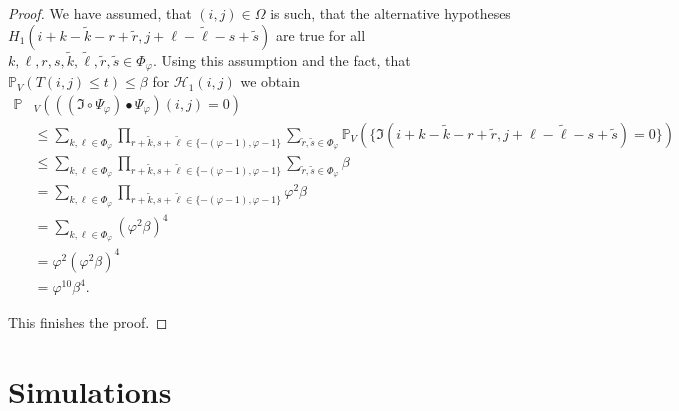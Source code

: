 \documentclass[a4paper,12pt]{article}
\theoremstyle{plain}
\theoremstyle{definition}
\begin{document}
\begin{appendix}
\begin{proof}
		We have assumed, that $(i, j) \in \Omega$ is such, that the alternative hypotheses $H_1(i + k - \tilde{k} - r + \tilde{r}, j + \ell - \tilde{\ell} - s + \tilde{s})$ are true for all $k, \ell, r, s, \tilde{k}, \tilde{\ell}, \tilde{r}, \tilde{s} \in \Phi_\varphi$. Using this assumption and the fact, that $\mathbb{P}_V\left( T(i, j) \leq t \right) \leq \beta$ for $\mathcal{H}_1(i, j)$ we obtain
		\begin{align*}
			\mathbb{P}&_V\left( ((\mathfrak{I} \circ \Psi_\varphi) \bullet \Psi_\varphi)(i, j) = 0 \right) \\
			&\leq \sum_{k, \ell \in \Phi_\varphi} \prod_{r + \tilde{k}, s + \tilde{\ell} \in \{ - ( \varphi - 1 ), \varphi - 1 \}} \sum_{\tilde{r}, \tilde{s} \in \Phi_\varphi} \mathbb{P}_V\left( \{ \mathfrak{I}(i + k - \tilde{k} - r + \tilde{r}, j + \ell - \tilde{\ell} - s + \tilde{s}) = 0 \} \right) \\
			&\leq \sum_{k, \ell \in \Phi_\varphi} \prod_{r + \tilde{k}, s + \tilde{\ell} \in \{ - ( \varphi - 1 ), \varphi - 1 \}} \sum_{\tilde{r}, \tilde{s} \in \Phi_\varphi} \beta \\
			&= \sum_{k, \ell \in \Phi_\varphi} \prod_{r + \tilde{k}, s + \tilde{\ell} \in \{ - ( \varphi - 1 ), \varphi - 1 \}} \varphi^2 \beta \\
			&= \sum_{k, \ell \in \Phi_\varphi} ( \varphi^2 \beta )^4 \\
			&= \varphi^2 ( \varphi^2 \beta )^4 \\
			&= \varphi^{10} \beta^4.
		\end{align*}
		
		This finishes the proof.
	\end{proof}
	
	\newpage
	
	\section{Simulations}\label{appendix: simulations}
	
%	
%	
%	
%	
%	
%	
%	
%	
%	
%	
%	
%	
%	
%	
%	
%	
%	
%	
%	
%	
%	
%	
%	
%	
%	
%	
%	
	

\end{appendix}
\end{document}
